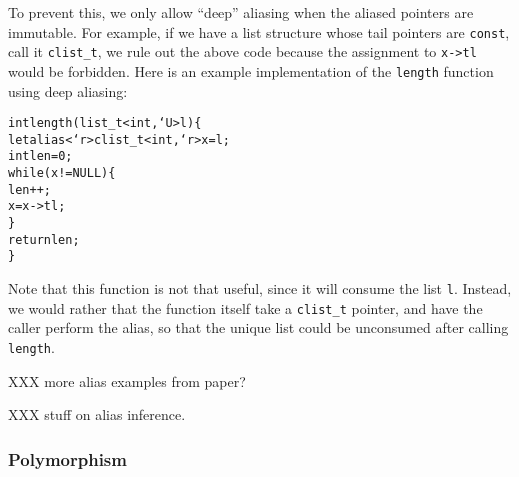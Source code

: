 To prevent this, we only allow ``deep'' aliasing when the aliased pointers
are immutable.  For example, if we have a list structure whose tail pointers
are \texttt{const}, call it \texttt{clist\_t}, we rule out the above code
because the assignment to \texttt{x->tl} would be forbidden.  Here is an
example implementation of the \texttt{length} function using deep aliasing:
\begin{alltt}
  int length(list\_t<int,`U> l) \{
    let alias <`r>clist\_t<int,`r> x = l;
    int len = 0;
    while (x != NULL) \{
      len++;
      x = x->tl;
    \}
    return len;
  \}
\end{alltt}
Note that this function is not that useful, since it will consume the list
\texttt{l}.  Instead, we would rather that the function itself take a
\texttt{clist\_t} pointer, and have the caller perform the alias, so that
the unique list could be unconsumed after calling \texttt{length}.

XXX more alias examples from paper?

XXX stuff on alias inference.


\subsubsection{Polymorphism}
\label{sec:poly-allocate}

